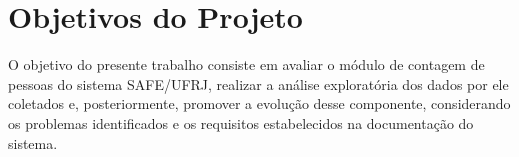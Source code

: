 \section{Objetivos do Projeto}
\label{sec:objetivos}
O objetivo do presente trabalho consiste em avaliar o módulo de contagem de pessoas do sistema SAFE/UFRJ, realizar a análise exploratória dos dados por ele coletados e, posteriormente, promover a evolução desse componente, considerando os problemas identificados e os requisitos estabelecidos na documentação do sistema.
